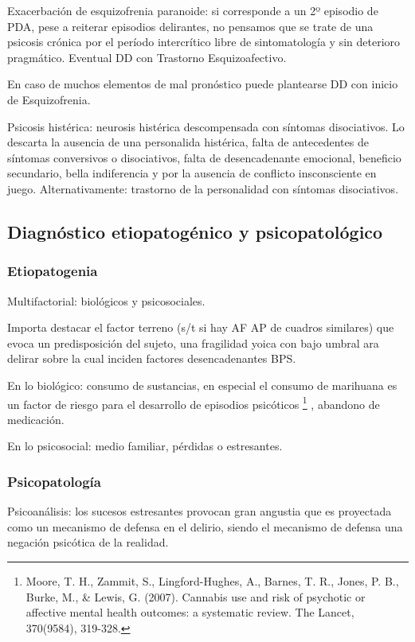 \documentclass{scrbook}
\begin{document}
Exacerbación de esquizofrenia paranoide: si corresponde a un 2º episodio de PDA, pese a reiterar episodios delirantes, no pensamos que se trate de una psicosis crónica por el período intercrítico libre de sintomatología y sin deterioro pragmático. Eventual DD con Trastorno Esquizoafectivo.

En caso de muchos elementos de mal pronóstico puede plantearse DD con inicio de Esquizofrenia.

Psicosis histérica: neurosis histérica descompensada con síntomas disociativos. Lo descarta la ausencia de una personalida histérica, falta de antecedentes de síntomas conversivos o disociativos, falta de desencadenante emocional, beneficio secundario, bella indiferencia y por la ausencia de conflicto insconsciente en juego. Alternativamente: trastorno de la personalidad con síntomas disociativos.

\subsection*{Diagnóstico etiopatogénico y psicopatológico}
\subsubsection*{Etiopatogenia}
Multifactorial: biológicos y psicosociales.

Importa destacar el factor terreno (s/t si hay AF AP de cuadros similares) que evoca un predisposición del sujeto, una fragilidad yoica con bajo umbral ara delirar sobre la cual inciden factores desencadenantes BPS.

En lo biológico: consumo de sustancias, en especial el consumo de marihuana es un factor de riesgo para el desarrollo de episodios psicóticos \footnote{Moore, T. H., Zammit, S., Lingford-Hughes, A., Barnes, T. R., Jones, P. B., Burke, M., \& Lewis, G. (2007). Cannabis use and risk of psychotic or affective mental health outcomes: a systematic review. The Lancet, 370(9584), 319-328.} , abandono de medicación.

En lo psicosocial: medio familiar, pérdidas o estresantes.
\subsubsection*{Psicopatología}
Psicoanálisis: los sucesos estresantes provocan gran angustia que es proyectada como un mecanismo de defensa en el delirio, siendo el mecanismo de defensa una negación psicótica de la realidad.
\end{document}
